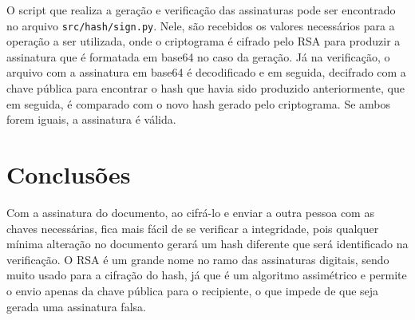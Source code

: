 \documentclass[12pt]{article}
\begin{document}
O script que realiza a geração e verificação das assinaturas pode ser encontrado no arquivo \texttt{src/hash/sign.py}. Nele, são recebidos os valores necessários para a operação a ser utilizada, onde o criptograma é cifrado pelo RSA para produzir a assinatura que é formatada em base64 no caso da geração. Já na verificação, o arquivo com a assinatura em base64 é decodificado e em seguida, decifrado com a chave pública para encontrar o hash que havia sido produzido anteriormente, que em seguida, é comparado com o novo hash gerado pelo criptograma. Se ambos forem iguais, a assinatura é válida.

\section{Conclusões}

Com a assinatura do documento, ao cifrá-lo e enviar a outra pessoa com as chaves necessárias, fica mais fácil de se verificar a integridade, pois qualquer mínima alteração no documento gerará um hash diferente que será identificado na verificação. O RSA é um grande nome no ramo das assinaturas digitais, sendo muito usado para a cifração do hash, já que é um algoritmo assimétrico e permite o envio apenas da chave pública para o recipiente, o que impede de que seja gerada uma assinatura falsa.
\end{document}
